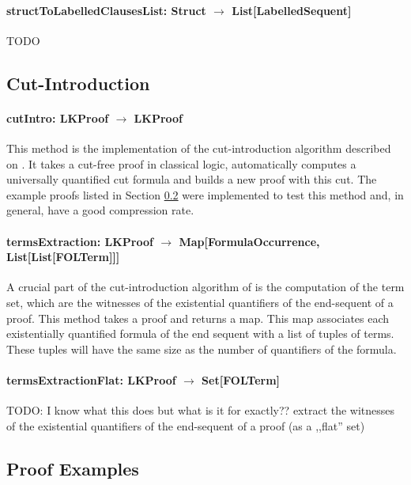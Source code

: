 \documentclass[a4paper, 11pt]{report}
\begin{document}
\paragraph{\textbf{structToLabelledClausesList: Struct $\rightarrow$ List[LabelledSequent]}}
{\color{red}TODO}

\subsection{Cut-Introduction}

\paragraph{\textbf{cutIntro: LKProof $\rightarrow$ LKProof}}
This method is the implementation of the cut-introduction algorithm described on
\cite{Hetzl2012}. It takes a cut-free proof in classical logic, automatically
computes a universally quantified cut formula and builds a new proof with this
cut. The example proofs listed in Section \ref{sec:exampleproofs} were
implemented to test this method and, in general, have a good compression rate.

\paragraph{\textbf{termsExtraction: LKProof $\rightarrow$ Map[FormulaOccurrence, List[List[FOLTerm]]]}}
A crucial part of the cut-introduction algorithm of \cite{Hetzl2012} is the
computation of the term set, which are the witnesses of the existential
quantifiers of the end-sequent of a proof. This method takes a proof and returns
a map. This map associates each existentially quantified formula of the end
sequent with a list of tuples of terms. These tuples will have the same size as
the number of quantifiers of the formula.

\paragraph{\textbf{termsExtractionFlat: LKProof $\rightarrow$ Set[FOLTerm]}}
{\color{red}TODO: I know what this does but what is it for exactly??} extract
the witnesses of the existential quantifiers of the end-sequent of a proof (as a
,,flat'' set)

\subsection{Proof Examples}
\label{sec:exampleproofs}
\end{document}

